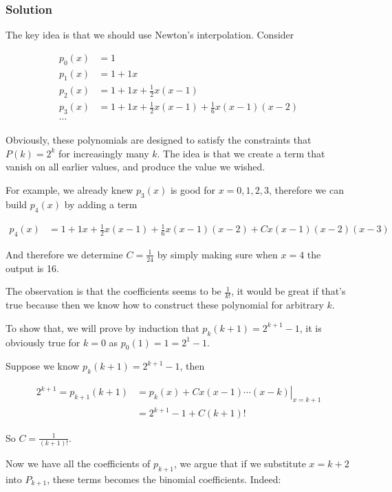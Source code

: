 \documentclass{article}
\begin{document}
\subsubsection*{Solution}
The key idea is that we should use Newton's interpolation. Consider 

\begin{align*}
  p_0(x) &= 1 \\
  p_1(x) &= 1 + 1x \\
  p_2(x) &= 1 + 1x + \frac{1}{2}x(x-1) \\
  p_3(x) &= 1 + 1x + \frac{1}{2}x(x-1) + \frac{1}{6}x(x-1)(x-2)\\
  \cdots
\end{align*}

Obviously, these polynomials are designed to satisfy the constraints that $ P(k) = 2^k $ for increasingly many $ k $. The idea is that we create a term that vanish on all earlier values, and produce the value we wished.

For example, we already knew $ p_3(x) $ is good for $ x = 0, 1, 2, 3 $, therefore we can build $ p_4(x) $ by adding a term 

\begin{align*}
  p_4(x) &= 1 + 1x + \frac{1}{2}x(x-1) + \frac{1}{6}x(x-1)(x-2) + Cx(x-1)(x-2)(x-3)
\end{align*}

And therefore we determine $ C = \frac{1}{24} $ by simply making sure when $ x = 4 $ the output is 16. 

The observation is that the coefficients seems to be $ \frac{1}{k!} $, it would be great if that's true because then we know how to construct these polynomial for arbitrary $ k $.

To show that, we will prove by induction that $ p_k(k+1) = 2^{k + 1} - 1 $, it is obviously true for $ k = 0 $ as $ p_0(1) = 1 = 2^{1} - 1 $.

Suppose we know $ p_k(k+1) = 2^{k + 1} - 1 $, then

\begin{align*}
  2^{k+1} = p_{k+1}(k+1) &= \left. p_k(x) + Cx(x-1)\cdots(x - k) \right|_{x=k+1} \\
                         &= 2^{k + 1} - 1 + C (k + 1)!
\end{align*}

So $ C = \frac{1}{(k + 1)!} $.

Now we have all the coefficients of $ p_{k+1} $, we argue that if we substitute $ x = k + 2 $ into $ P_{k+1} $, these terms becomes the binomial coefficients. Indeed:
\end{document}

